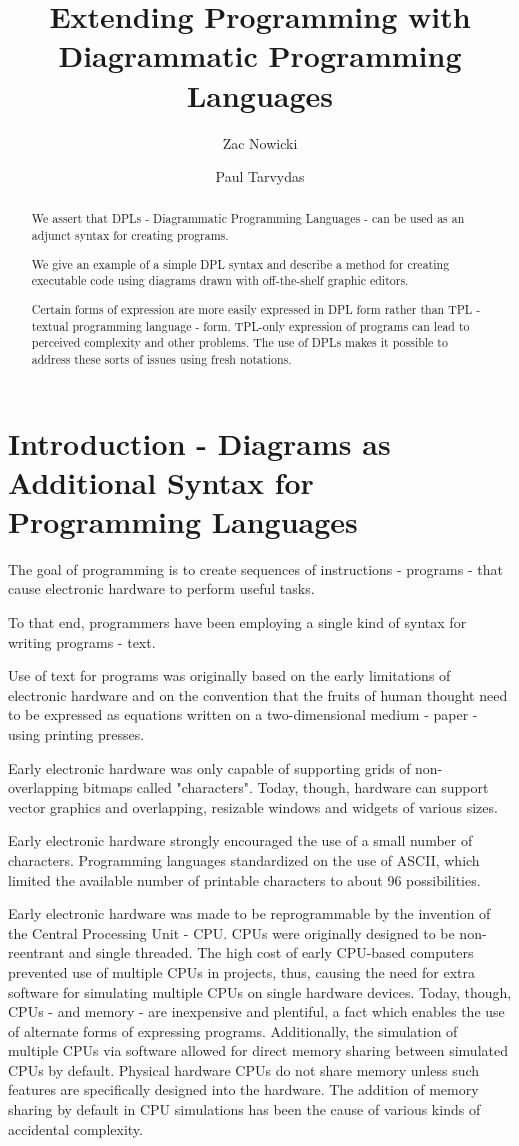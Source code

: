 \documentclass[10pt,anonymous,review]{acmart}
\title{Extending Programming with Diagrammatic Programming Languages}
\author{Zac Nowicki}
\affiliation{
  \institution{Kagi Inc.}
  \city{Palo Alto}
  \state{CA}
  \country{USA}
}
\author{Paul Tarvydas}
\affiliation{
  \institution{Retired}
  \city{Toronto}
  \state{Ontario}
  \country{Canada}
}
\begin{document}
\begin{abstract}

We assert that DPLs - Diagrammatic Programming Languages - can be used as an adjunct syntax for creating programs.

We give an example of a simple DPL syntax and describe a method for creating executable code using diagrams drawn with off-the-shelf graphic editors.
  
Certain forms of expression are more easily expressed in DPL form rather than TPL - textual programming language - form. TPL-only expression of programs can lead to perceived complexity and other problems. The use of DPLs makes it possible to address these sorts of issues using fresh notations.
\end{abstract}

\maketitle

\section{Introduction - Diagrams as Additional Syntax for Programming Languages}
The goal of programming is to create sequences of instructions -
programs - that cause electronic hardware to perform useful tasks.

To that end, programmers have been employing a single kind of syntax for writing programs -
text.

Use of text for programs was originally based on the early limitations of
electronic hardware and on the convention that the fruits of human thought need to be
expressed as equations written on a two-dimensional medium - paper -
using printing presses.

Early electronic hardware was only capable of supporting grids of
non-overlapping bitmaps called "characters". Today, though, hardware can
support vector graphics and overlapping, resizable windows and widgets of various sizes.

Early electronic hardware strongly encouraged the use of a small number of characters. Programming languages standardized on the use of ASCII, which limited the available number of printable characters to about 96 possibilities.

Early electronic hardware was made to be reprogrammable by the invention of
the Central Processing Unit - CPU. CPUs were originally designed to be
non-reentrant and single threaded. The high cost of early CPU-based
computers prevented use of multiple CPUs in projects, thus, causing the
need for extra software for simulating multiple CPUs on single
hardware devices. Today, though, CPUs - and memory - are inexpensive and
plentiful, a fact which enables the use of alternate forms of
expressing programs. Additionally, the simulation of multiple CPUs via software 
allowed for direct memory sharing between simulated CPUs by default. Physical 
hardware CPUs do not share memory unless such features are specifically 
designed into the hardware. The addition of memory sharing by default in CPU simulations
has been the cause of various kinds of accidental complexity.
\end{document}
